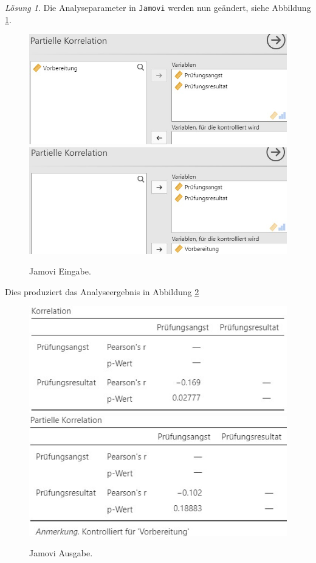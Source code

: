 \documentclass[
]{book}
\theoremstyle{definition}
\theoremstyle{definition}
\theoremstyle{definition}
\theoremstyle{definition}
\theoremstyle{remark}
\newtheorem*{solution}{Lösung}
\begin{document}
\begin{solution}

Die Analyseparameter in \texttt{Jamovi} werden nun geändert, siehe Abbildung \ref{fig:sol-test-preparation-input}.

\begin{figure}
\includegraphics[width=0.5\linewidth]{figures/08-exr-test-preparation-jmv-input1} \includegraphics[width=0.5\linewidth]{figures/08-exr-test-preparation-jmv-input2} \caption{Jamovi Eingabe.}\label{fig:sol-test-preparation-input}
\end{figure}

Dies produziert das Analyseergebnis in Abbildung \ref{fig:sol-test-preparation-output}

\begin{figure}
\includegraphics[width=0.5\linewidth]{figures/08-exr-test-preparation-jmv-output1} \includegraphics[width=0.5\linewidth]{figures/08-exr-test-preparation-jmv-output2} \caption{Jamovi Ausgabe.}\label{fig:sol-test-preparation-output}
\end{figure}


\end{solution}
\end{document}
